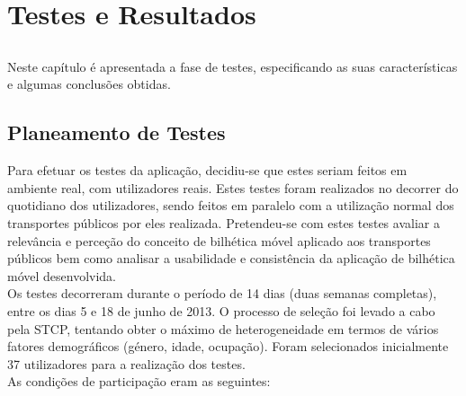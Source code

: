 \chapter{Testes e Resultados} \label{chap:testes}

\section*{}

Neste capítulo é apresentada a fase de testes, especificando as suas características e algumas conclusões obtidas.

\section{Planeamento de Testes}

Para efetuar os testes da aplicação, decidiu-se que estes seriam feitos em ambiente real, com utilizadores reais. Estes testes foram realizados no decorrer do quotidiano dos utilizadores, sendo feitos em paralelo com a utilização normal dos transportes públicos por eles realizada. Pretendeu-se com estes testes avaliar a relevância e perceção do conceito de bilhética móvel aplicado aos transportes públicos bem como analisar a usabilidade e consistência da aplicação de bilhética móvel desenvolvida.
\\Os testes decorreram durante o período de 14 dias (duas semanas completas), entre os dias 5 e 18 de junho de 2013. O processo de seleção foi levado a cabo pela STCP, tentando obter o máximo de heterogeneidade em termos de vários fatores demográficos (género, idade, ocupação). Foram selecionados inicialmente 37 utilizadores para a realização dos testes.\cite{stcp}
\\As condições de participação eram as seguintes:

